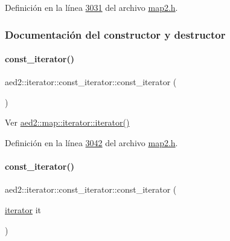Definición en la línea \hyperlink{map2_8h_source_l03031}{3031} del archivo \hyperlink{map2_8h_source}{map2.\+h}.



\subsubsection{Documentación del constructor y destructor}
\mbox{\label{classaed2_1_1iterator_1_1const__iterator_aaa51a026552b907959961fb5e890f786_aaa51a026552b907959961fb5e890f786}} 
\paragraph{\texorpdfstring{const\+\_\+iterator()}{const\_iterator()}\hspace{0.1cm}{\footnotesize\ttfamily [1/3]}}
{\footnotesize\ttfamily aed2\+::iterator\+::const\+\_\+iterator\+::const\+\_\+iterator (\begin{DoxyParamCaption}{ }\end{DoxyParamCaption})\hspace{0.3cm}{\ttfamily [inline]}}



Ver \hyperlink{classaed2_1_1map_1_1iterator_acdd790eb54216601a2e0591776004dba_acdd790eb54216601a2e0591776004dba}{aed2\+::map\+::iterator\+::iterator()} 



Definición en la línea \hyperlink{map2_8h_source_l03042}{3042} del archivo \hyperlink{map2_8h_source}{map2.\+h}.

\mbox{\label{classaed2_1_1iterator_1_1const__iterator_a721711310bb4fc525e4ce9a2b13f7ce9_a721711310bb4fc525e4ce9a2b13f7ce9}} 
\paragraph{\texorpdfstring{const\+\_\+iterator()}{const\_iterator()}\hspace{0.1cm}{\footnotesize\ttfamily [2/3]}}
{\footnotesize\ttfamily aed2\+::iterator\+::const\+\_\+iterator\+::const\+\_\+iterator (\begin{DoxyParamCaption}\item[{\hyperlink{classaed2_1_1iterator_1_1iterator}{iterator}}]{it }\end{DoxyParamCaption})\hspace{0.3cm}{\ttfamily [inline]}}



